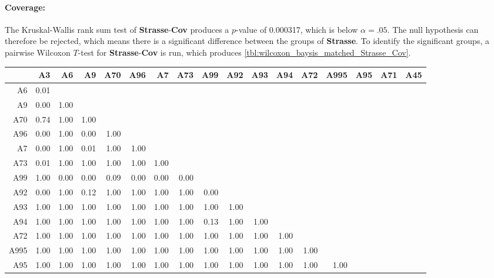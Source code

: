 \paragraph{Coverage:}
The Kruskal-Wallis rank sum test of \textbf{Strasse}-\textbf{Cov} produces a $p$-value of 0.000317, which is below $\alpha=.05$. The null hypothesis can therefore be rejected, which means there is a significant difference between the groups of \textbf{Strasse}. To identify the significant groups, a pairwise Wilcoxon $T$-test for \textbf{Strasse}-\textbf{Cov} is run, which produces \autoref{tbl:wilcoxon_baysis_matched_Strasse_Cov}. 
\begin{table}[ht]
	\tiny
	\setlength{\tabcolsep}{4pt}
	\centering
	\begin{tabular}{rrrrrrrrrrrrrrrrr}
	  	\toprule
				& A3   & A6   & A9   & A70  & A96  & A7   & A73 & A99 & A92 & A93 & A94 & A72 & A995 & A95 & A71 & A45 \\ 
	  	\midrule
		A6 		& 0.01 &  &  &  &  &  &  &  &  &  &  &  &  &  &  &  \\ 
	  	A9 		& 0.00 & 1.00 &  &  &  &  &  &  &  &  &  &  &  &  &  &  \\ 
	  	A70 	& 0.74 & 1.00 & 1.00 &  &  &  &  &  &  &  &  &  &  &  &  &  \\ 
	  	A96 	& 0.00 & 1.00 & 0.00 & 1.00 &  &  &  &  &  &  &  &  &  &  &  &  \\ 
	  	A7 		& 0.00 & 1.00 & 0.01 & 1.00 & 1.00 &  &  &  &  &  &  &  &  &  &  &  \\ 
	  	A73 	& 0.01 & 1.00 & 1.00 & 1.00 & 1.00 & 1.00 &  &  &  &  &  &  &  &  &  &  \\ 
	  	A99 	& 1.00 & 0.00 & 0.00 & 0.09 & 0.00 & 0.00 & 0.00 &  &  &  &  &  &  &  &  &  \\ 
	  	A92 	& 0.00 & 1.00 & 0.12 & 1.00 & 1.00 & 1.00 & 1.00 & 0.00 &  &  &  &  &  &  &  &  \\ 
	  	A93 	& 1.00 & 1.00 & 1.00 & 1.00 & 1.00 & 1.00 & 1.00 & 1.00 & 1.00 &  &  &  &  &  &  &  \\ 
	  	A94 	& 1.00 & 1.00 & 1.00 & 1.00 & 1.00 & 1.00 & 1.00 & 0.13 & 1.00 & 1.00 &  &  &  &  &  &  \\ 
	  	A72 	& 1.00 & 1.00 & 1.00 & 1.00 & 1.00 & 1.00 & 1.00 & 1.00 & 1.00 & 1.00 & 1.00 &  &  &  &  &  \\ 
	  	A995 	& 1.00 & 1.00 & 1.00 & 1.00 & 1.00 & 1.00 & 1.00 & 1.00 & 1.00 & 1.00 & 1.00 & 1.00 &  &  &  &  \\ 
	  	A95 	& 1.00 & 1.00 & 1.00 & 1.00 & 1.00 & 1.00 & 1.00 & 1.00 & 1.00 & 1.00 & 1.00 & 1.00 & 1.00 &  &  &  \\ 

\end{tabular}
\end{table}
